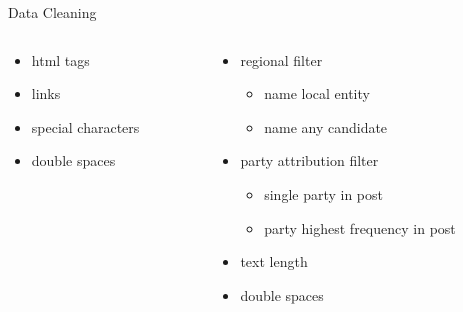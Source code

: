 \documentclass[usenames,dvipsnames,aspectratio=169]{beamer}
\begin{document}
	\begin{frame}{Data Cleaning}
		\begin{columns}
			
			\begin{column}{0.45\textwidth}
				\begin{tcolorbox}[colback=white, colframe=ElixirPurple, arc=3mm, boxrule=0mm, height=0.8\textheight, valign=center, title=Text Cleaning]
					
				\begin{itemize}
					\item html tags
					\item links
					\item special characters
					\item double spaces
				\end{itemize}
				
				
				\end{tcolorbox}
			\end{column}
			
			\begin{column}{0.45\textwidth}
				\begin{tcolorbox}[colback=white, colframe=ElixirPurple, arc=3mm, boxrule=0mm, height=0.8\textheight, valign=center, title=Post Selection]
					
					\begin{itemize}
						\item regional filter
						\begin{itemize}
							\item name local entity
							\item name any candidate
						\end{itemize}
						\item party attribution filter
												\begin{itemize}
							\item single party in post
							\item party highest frequency in post
						\end{itemize}
						\item text length
						\item double spaces
					\end{itemize}
					
					
				\end{tcolorbox}
			\end{column}
		\end{columns}
	\end{frame}
	
\end{document}
